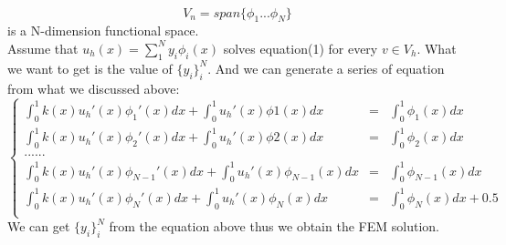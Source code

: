 \documentclass[a4paper,12pt]{article}
\begin{document}
\\$$V_n = span\{\phi_1...\phi_N\}$$ is a N-dimension functional space.
\\Assume that $u_h(x)=\sum_1^Ny_i\phi_i(x)$ solves equation(1) for every $v \in V_h$. What we want to get is the value of $\{y_i\}_i^N$. And we can generate a series of equation from what we discussed above:\\
$$
\left\{
\begin{array}{rcl}
\int_0^1k(x)u_h'(x)\phi_1'(x)dx + \int_0^1u_h'(x)\phi1(x)dx &=& \int_0^1\phi_1(x)dx\\
\int_0^1k(x)u_h'(x)\phi_2'(x)dx + \int_0^1u_h'(x)\phi2(x)dx &=& \int_0^1\phi_2(x)dx\\
......& & \\
\int_0^1k(x)u_h'(x)\phi_{N-1}'(x)dx +\int_0^1u_h'(x)\phi_{N-1}(x)dx &=& \int_0^1\phi_{N-1}(x)dx\\
\int_0^1k(x)u_h'(x)\phi_{N}'(x)dx + \int_0^1u_h'(x)\phi_{N}(x)dx &=& \int_0^1\phi_{N}(x)dx + 0.5 \\
\end{array} \right.
$$
We can get $\{y_i\}_i^N$ from the equation above thus we obtain the FEM solution.
\end{document}
